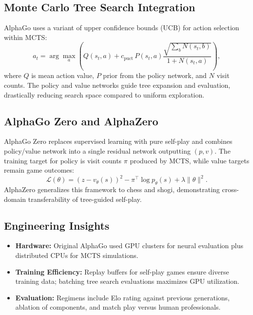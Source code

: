 \documentclass{article}
\begin{document}
\subsection{Monte Carlo Tree Search Integration}
AlphaGo uses a variant of upper confidence bounds (UCB) for action selection within MCTS:
\begin{equation}
  a_t = \arg\max_{a} \left( Q(s_t, a) + c_{\mathrm{puct}} \, P(s_t, a) \frac{\sqrt{ \sum_b N(s_t, b) }}{1 + N(s_t, a)} \right),
\end{equation}
where $Q$ is mean action value, $P$ prior from the policy network, and $N$ visit counts. The policy and value networks guide tree expansion and evaluation, drastically reducing search space compared to uniform exploration.

\subsection{AlphaGo Zero and AlphaZero}
AlphaGo Zero replaces supervised learning with pure self-play and combines policy/value network into a single residual network outputting $(p, v)$. The training target for policy is visit counts $\pi$ produced by MCTS, while value targets remain game outcomes:
\begin{equation}
  \mathcal{L}(\theta) = (z - v_{\theta}(s))^2 - \pi^{\top} \log p_{\theta}(s) + \lambda \|\theta\|^2.
\end{equation}
AlphaZero generalizes this framework to chess and shogi, demonstrating cross-domain transferability of tree-guided self-play.

\subsection{Engineering Insights}
\begin{itemize}
  \item \textbf{Hardware:} Original AlphaGo used GPU clusters for neural evaluation plus distributed CPUs for MCTS simulations.
  \item \textbf{Training Efficiency:} Replay buffers for self-play games ensure diverse training data; batching tree search evaluations maximizes GPU utilization.
  \item \textbf{Evaluation:} Regimens include Elo rating against previous generations, ablation of components, and match play versus human professionals.
\end{itemize}
\end{document}
